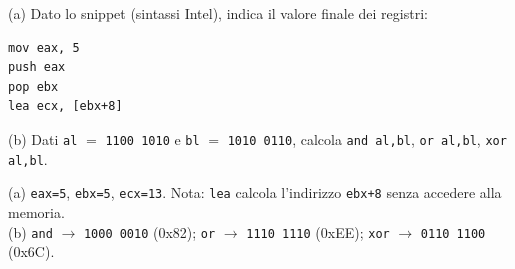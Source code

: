 \question[6]
(a) Dato lo snippet (sintassi Intel), indica il valore finale dei registri:
\begin{lstlisting}[style=asm]
mov eax, 5
push eax
pop ebx
lea ecx, [ebx+8]
\end{lstlisting}
(b) Dati \lstinline|al| $=$ \lstinline|1100 1010| e \lstinline|bl| $=$ \lstinline|1010 0110|, calcola \lstinline|and al,bl|, \lstinline|or al,bl|, \lstinline|xor al,bl|.
\begin{solution}
(a) \lstinline|eax=5|, \lstinline|ebx=5|, \lstinline|ecx=13|. Nota: \lstinline|lea| calcola l'indirizzo \lstinline|ebx+8| senza accedere alla memoria.\\
(b) \lstinline|and| $\to$ \lstinline|1000 0010| (0x82); \lstinline|or| $\to$ \lstinline|1110 1110| (0xEE); \lstinline|xor| $\to$ \lstinline|0110 1100| (0x6C).
\end{solution}
